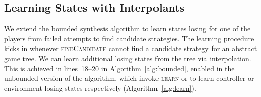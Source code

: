 



\subsection{Learning States with Interpolants}

We extend the bounded synthesis algorithm to learn states losing for one of the
players from failed attempts to find candidate strategies.  The learning
procedure kicks in whenever \textsc{findCandidate} cannot find a candidate
strategy for an abstract game tree. We can learn additional losing states from
the tree via interpolation.  This is achieved in lines~18--20 in
Algorithm~\ref{alg:bounded}, enabled in the unbounded version of the algorithm,
which invoke \textsc{learn} or \textsc{} to learn
controller or environment losing states respectively
(Algorithm~\ref{alg:learn}).



